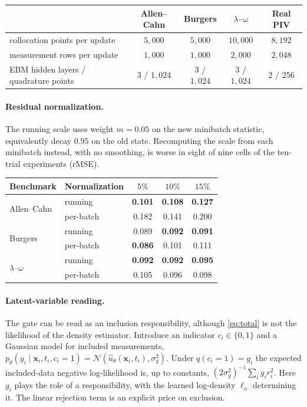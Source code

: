 \documentclass[twoside]{article}
\begin{document}
\begin{center}\small
\setlength{\tabcolsep}{6pt}
\begin{tabular}{lcccc}
\toprule
 & Allen--Cahn & Burgers & $\lambda$--$\omega$ & Real PIV \\
\midrule
collocation points per update & $5{,}000$ & $5{,}000$ & $10{,}000$ & $8{,}192$ \\
measurement rows per update    & $1{,}000$ & $1{,}000$ & $2{,}000$ & $2{,}048$ \\
EBM hidden layers / quadrature points & $3$ / $1{,}024$ & $3$ / $1{,}024$ & $3$ / $1{,}024$ & $2$ / $256$ \\
\bottomrule
\end{tabular}
\end{center}

\paragraph{Residual normalization.}
The running scale uses weight $m = 0.05$ on the new minibatch statistic,
equivalently decay $0.95$ on the old state. Recomputing the scale from each
minibatch instead, with no smoothing, is worse in eight of nine cells of the
ten-trial experiments (rMSE).

\begin{center}\small
\begin{tabular}{llccc}
\toprule
Benchmark & Normalization & $5\%$ & $10\%$ & $15\%$ \\
\midrule
\multirow{2}{*}{Allen--Cahn}
 & running & \textbf{0.101} & \textbf{0.108} & \textbf{0.127} \\
 & per-batch & 0.182 & 0.141 & 0.200 \\
\midrule
\multirow{2}{*}{Burgers}
 & running & 0.089 & \textbf{0.092} & \textbf{0.091} \\
 & per-batch & \textbf{0.086} & 0.101 & 0.111 \\
\midrule
\multirow{2}{*}{$\lambda$--$\omega$}
 & running & \textbf{0.092} & \textbf{0.092} & \textbf{0.095} \\
 & per-batch & 0.105 & 0.096 & 0.098 \\
\bottomrule
\end{tabular}
\end{center}

\paragraph{Latent-variable reading.}
The gate can be read as an inclusion responsibility, although \cref{eq:total}
is not the likelihood of the density estimator. Introduce an indicator
$c_i \in \{0,1\}$ and a Gaussian model for included measurements,
$p_\theta(y_i \mid \mathbf{x}_i, t_i, c_i{=}1) =
\mathcal{N}(\hat u_\theta(\mathbf{x}_i, t_i), \sigma_y^2)$. Under
$q(c_i{=}1) = g_i$ the expected included-data negative log-likelihood is, up to
constants, $(2\sigma_y^2)^{-1}\sum_i g_i r_i^2$. Here $g_i$ plays the role of a
responsibility, with the learned log-density $\ell_\phi$ determining it. The
linear rejection term is an explicit price on exclusion.
\end{document}
